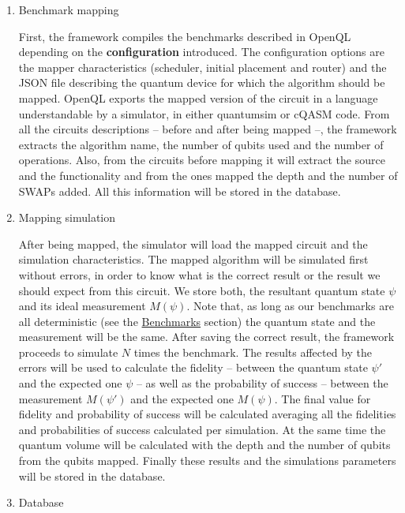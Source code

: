 \begin{enumerate}
\item Benchmark mapping
\label{sec:orge67926f}

First, the framework compiles the benchmarks described in OpenQL depending on the \textbf{configuration} introduced.
The configuration options are the mapper characteristics (scheduler, initial placement and router) and the JSON file describing the quantum device for which the algorithm should be mapped.
OpenQL exports the mapped version of the circuit in a language understandable by a simulator, in either quantumsim or cQASM \cite{khammassi18} code.
From all the circuits descriptions -- before and after being mapped --, the framework extracts the algorithm name, the number of qubits used and the number of operations.
Also, from the circuits before mapping it will extract the source and the functionality and from the ones mapped the depth and the number of SWAPs added.
All this information will be stored in the database.

\item Mapping simulation
\label{sec:org033fd05}

After being mapped, the simulator will load the mapped circuit and the simulation characteristics.
The mapped algorithm will be simulated first without errors, in order to know what is the correct result or the result we should expect from this circuit.
We store both, the resultant quantum state \(\psi\) and its ideal measurement \(M(\psi)\).
Note that, as long as our benchmarks are all deterministic (see the \hyperref[sec:orga02804b]{Benchmarks} section) the quantum state and the measurement will be the same.
After saving the correct result, the framework proceeds to simulate \(N\) times the benchmark.
The results affected by the errors will be used to calculate the fidelity -- between the quantum state \(\psi'\) and the expected one \(\psi\) -- as well as the probability of success -- between the measurement \(M(\psi')\) and the expected one \(M(\psi)\).
The final value for fidelity and probability of success will be calculated averaging all the fidelities and probabilities of success calculated per simulation.
At the same time the quantum volume will be calculated with the depth and the number of qubits from the qubits mapped.
Finally these results and the simulations parameters will be stored in the database.

\item Database
\label{sec:orgb5f5bb4}


\end{enumerate}

